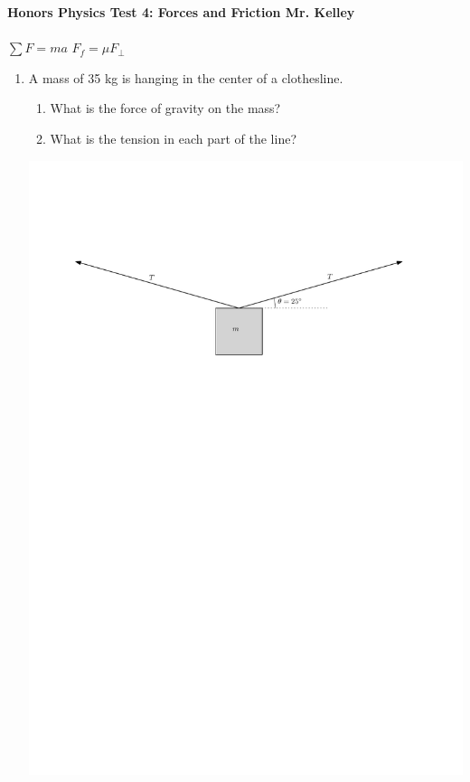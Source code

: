 \documentclass[12pt]{report}
\newcommand{ \multChoice}[5]{ \item #1 \begin{multicols}{2} \begin{enumerate} \item #2 \\ \item #3 \\ \item #4 \\ \item #5 \\ \end{enumerate} \end{multicols}}
\begin{document}
{\bf{Honors Physics} \hfill {Test 4: Forces and Friction} \hfill {Mr. Kelley}} \\ \\
\mbox{} \hfill $\sum F=ma$ \hfill $F_f=\mu F_\bot$ \hfill \mbox{}


\begin{enumerate}
\item A mass of 35 kg is hanging in the center of a clothesline.
\begin{enumerate}
\item What is the force of gravity on the mass?\\
\item What is the tension in each part of the line?\\
\end{enumerate}
\vspace{1cm}

\includegraphics{massClothesline} 


\end{enumerate}
\end{document}
